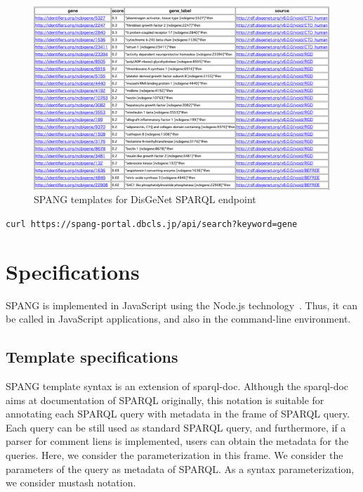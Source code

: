 \documentclass[runningheads]{llncs}
\begin{document}
\begin{figure}
\center
\includegraphics[width=1.0\textwidth]{spang_disease_gene_result.png}
\caption{SPANG templates for DisGeNet SPARQL endpoint}
\label{fig:spang_disease_gene_result}
\end{figure}




\texttt{curl https://spang-portal.dbcls.jp/api/search?keyword=gene}


\section{Specifications}

SPANG is implemented in JavaScript using the Node.js technology~\cite{nodejs}. Thus, it can be called in JavaScript applications, and also in the command-line environment.

\subsection{Template specifications}
SPANG template syntax is an extension of sparql-doc. Although the sparql-doc aims at documentation of SPARQL originally, this notation is suitable for annotating each SPARQL query with metadata in the frame of SPARQL query. Each query can be still used as standard SPARQL query, and furthermore, if a parser for comment liens is implemented, users can obtain the metadata for the queries.
Here, we consider the parameterization in this frame. We consider the parameters of the query as metadata of SPARQL.
As a syntax parameterization, we consider mustash notation.
\end{document}
